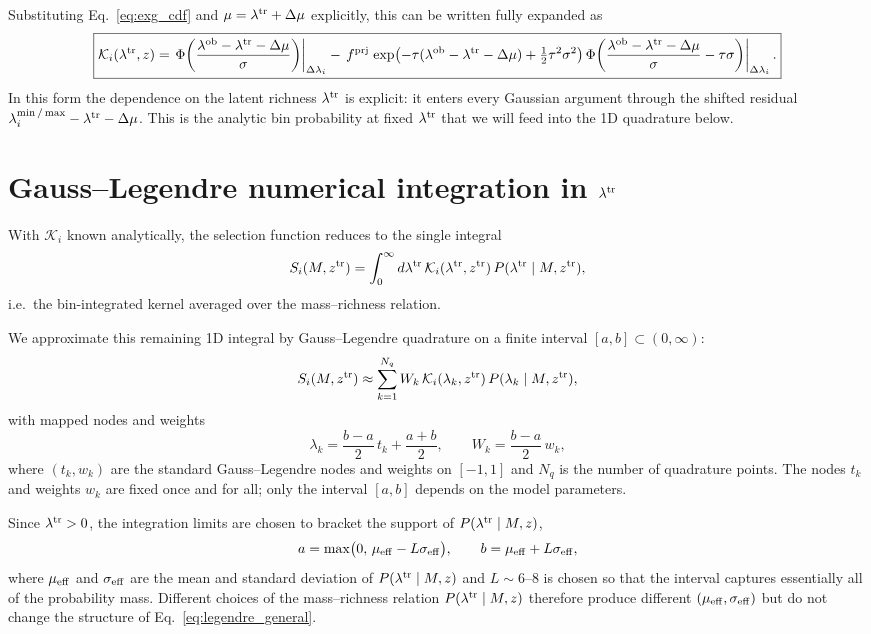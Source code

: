 \documentclass[a4paper, 11pt]{article}
\newcommand{\ltr}{\lambda^{\rm tr}}
\newcommand{\lob}{\lambda^{\rm ob}}
\newcommand{\ztr}{z^{\rm tr}}
\begin{document}
Substituting Eq.~\eqref{eq:exg_cdf} and $\mu=\ltr+\Delta\mu$ explicitly, this can be written fully expanded as
\begin{equation}
\boxed{
\mathcal K_i(\ltr,z)
=
\left.\Phi\!\left(\frac{\lob-\ltr-\Delta\mu}{\sigma}\right)\right|_{\Delta\lambda_i}
-\,
f^{\rm prj}\left.
\exp\!\left(-\tau(\lob-\ltr-\Delta\mu)+\tfrac{1}{2}\tau^{2}\sigma^{2}\right)
\Phi\!\left(\frac{\lob-\ltr-\Delta\mu}{\sigma}-\tau\sigma\right)
\right|_{\Delta\lambda_i}.
}
\label{eq:Ki_final_expanded}
\end{equation}
In this form the dependence on the latent richness $\ltr$ is explicit: it enters every Gaussian argument through the shifted residual $\lambda_i^{\min/\max}-\ltr-\Delta\mu$. This is the analytic bin probability at fixed $\ltr$ that we will feed into the 1D quadrature below.

\section{Gauss--Legendre numerical integration in $\ltr$}

With $\mathcal K_i$ known analytically, the selection function reduces to the single integral
\begin{equation}
S_i(M,\ztr)
=
\int_0^\infty d\ltr\,
\mathcal K_i(\ltr,\ztr)\,
P(\ltr\mid M,\ztr),
\label{eq:Pi_1d}
\end{equation}
i.e.\ the bin-integrated kernel averaged over the mass--richness relation.

We approximate this remaining 1D integral by Gauss--Legendre quadrature on a finite interval $[a,b]\subset(0,\infty)$:
\begin{equation}
S_i(M,\ztr)
\approx
\sum_{k=1}^{N_q}
W_k\,
\mathcal K_i(\lambda_k,\ztr)\,
P(\lambda_k\mid M,\ztr),
\label{eq:legendre_general}
\end{equation}
with mapped nodes and weights
\begin{equation}
\lambda_k=\frac{b-a}{2}\,t_k+\frac{a+b}{2},
\qquad
W_k=\frac{b-a}{2}\,w_k,
\label{eq:legendre_nodes}
\end{equation}
where $(t_k,w_k)$ are the standard Gauss--Legendre nodes and weights on $[-1,1]$ and $N_q$ is the number of quadrature points. The nodes $t_k$ and weights $w_k$ are fixed once and for all; only the interval $[a,b]$ depends on the model parameters.

Since $\ltr>0$, the integration limits are chosen to bracket the support of $P(\ltr\mid M,z)$,
\begin{equation}
a=\max\!\big(0,\,\mu_{\rm eff}-L\sigma_{\rm eff}\big),
\qquad
b=\mu_{\rm eff}+L\sigma_{\rm eff},
\label{eq:ab_general}
\end{equation}
where $\mu_{\rm eff}$ and $\sigma_{\rm eff}$ are the mean and standard deviation of $P(\ltr\mid M,z)$ and $L\sim 6$--$8$ is chosen so that the interval captures essentially all of the probability mass. Different choices of the mass--richness relation $P(\ltr\mid M,z)$ therefore produce different $(\mu_{\rm eff},\sigma_{\rm eff})$ but do not change the structure of Eq.~\eqref{eq:legendre_general}.
\end{document}
